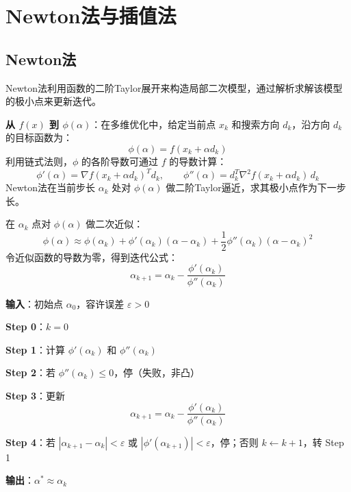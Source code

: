 \section{Newton法与插值法}\label{sec:newton-interpolation}

\subsection{Newton法}

Newton法利用函数的二阶Taylor展开来构造局部二次模型，通过解析求解该模型的极小点来更新迭代。

\textbf{从 $f(x)$ 到 $\phi(\alpha)$}：在多维优化中，给定当前点 $x_k$ 和搜索方向 $d_k$，沿方向 $d_k$ 的目标函数为：
\[
\phi(\alpha) = f(x_k + \alpha d_k)
\]
利用链式法则，$\phi$ 的各阶导数可通过 $f$ 的导数计算：
\[
\phi'(\alpha) = \nabla f(x_k + \alpha d_k)^T d_k,\qquad
\phi''(\alpha) = d_k^T \nabla^2 f(x_k + \alpha d_k)\, d_k
\]
Newton法在当前步长 $\alpha_k$ 处对 $\phi(\alpha)$ 做二阶Taylor逼近，求其极小点作为下一步长。

\begin{conceptbox}[Newton法原理]
在 $\alpha_k$ 点对 $\phi(\alpha)$ 做二次近似：
\[
\phi(\alpha) \approx \phi(\alpha_k) + \phi'(\alpha_k)(\alpha - \alpha_k) + \frac{1}{2}\phi''(\alpha_k)(\alpha - \alpha_k)^2
\]
令近似函数的导数为零，得到迭代公式：
\[
\alpha_{k+1} = \alpha_k - \frac{\phi'(\alpha_k)}{\phi''(\alpha_k)}
\]
\end{conceptbox}

\begin{algobox}[Newton法算法]
\textbf{输入}：初始点 $\alpha_0$，容许误差 $\varepsilon > 0$

\textbf{Step 0}：$k = 0$

\textbf{Step 1}：计算 $\phi'(\alpha_k)$ 和 $\phi''(\alpha_k)$

\textbf{Step 2}：若 $\phi''(\alpha_k) \leq 0$，停（失败，非凸）

\textbf{Step 3}：更新
\[
\alpha_{k+1} = \alpha_k - \frac{\phi'(\alpha_k)}{\phi''(\alpha_k)}
\]

\textbf{Step 4}：若 $|\alpha_{k+1} - \alpha_k| < \varepsilon$ 或 $|\phi'(\alpha_{k+1})| < \varepsilon$，停；否则 $k \leftarrow k+1$，转 Step 1

\textbf{输出}：$\alpha^* \approx \alpha_k$
\end{algobox}

